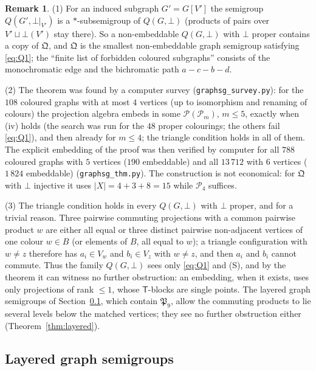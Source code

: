 \documentclass[11pt]{amsart}
\theoremstyle{definition}
\newtheorem{remark}[theorem]{Remark}
\renewcommand{\P}{\mathcal{P}}
\newcommand{\T}{\mathsf{T}}
\begin{document}
\begin{remark}\label{rem:graphthm}
(1) For an induced subgraph $G'=G[V']$ the semigroup $Q(G',\bot|_{V'})$ is a $*$-subsemigroup of $Q(G,\bot)$ (products of pairs over $V'\sqcup\bot(V')$ stay there). So a non-embeddable $Q(G,\bot)$ with $\bot$ proper contains a copy of $\mathfrak Q$, and $\mathfrak Q$ is the smallest non-embeddable graph semigroup satisfying \eqref{eq:Q1}; the ``finite list of forbidden coloured subgraphs'' consists of the monochromatic edge and the bichromatic path $a-c-b-d$.

(2) The theorem was found by a computer survey (\texttt{graphsg\_survey.py}): for the $108$ coloured graphs with at most $4$ vertices (up to isomorphism and renaming of colours) the projection algebra embeds in some $\P(\P_m)$, $m\le5$, exactly when (iv) holds (the search was run for the $48$ proper colourings; the others fail \eqref{eq:Q1}), and then already for $m\le4$; the triangle condition holds in all of them. The explicit embedding of the proof was then verified by computer for all $788$ coloured graphs with $5$ vertices ($190$ embeddable) and all $13\,712$ with $6$ vertices ($1\,824$ embeddable) (\texttt{graphsg\_thm.py}). The construction is not economical: for $\mathfrak Q$ with $\bot$ injective it uses $|X|=4+3+8=15$ while $\P_4$ suffices.

(3) The triangle condition holds in every $Q(G,\bot)$ with $\bot$ proper, and for a trivial reason. Three pairwise commuting projections with a common pairwise product $w$ are either all equal or three distinct pairwise non-adjacent vertices of one colour $w\in B$ (or elements of $B$, all equal to $w$); a triangle configuration with $w\ne z$ therefore has $a_i\in V_w$ and $b_i\in V_z$ with $w\ne z$, and then $a_i$ and $b_i$ cannot commute. Thus the family $Q(G,\bot)$ sees only \eqref{eq:Q1} and (S), and by the theorem it can witness no further obstruction: an embedding, when it exists, uses only projections of rank $\le1$, whose $\T$-blocks are single points. The layered graph semigroups of Section~\ref{subsec:layered}, which contain $\mathfrak P_9$, allow the commuting products to lie several levels below the matched vertices; they see no further obstruction either (Theorem~\ref{thm:layered}).
\end{remark}

\subsection{Layered graph semigroups}\label{subsec:layered}
\end{document}
